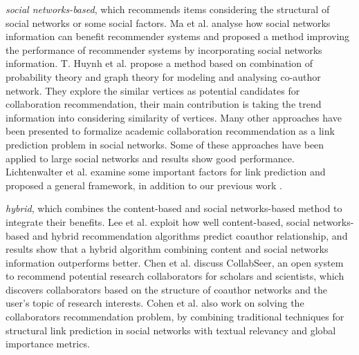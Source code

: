 \documentclass[review]{elsarticle}
\begin{document}
\emph{social networks-based}, which recommends items considering the structural of social networks or some social factors. Ma et al. \cite{ma2011recommender} analyse how social networks information can benefit recommender systems and proposed a method improving the performance of recommender systems by incorporating social networks information. T. Huynh et al. \cite{huynh2013trend} propose a method based on combination of probability theory and graph theory for modeling and analysing co-author network. They explore the similar vertices as potential candidates for collaboration recommendation, their main contribution is taking the trend information into considering similarity of vertices. Many other approaches have been presented to formalize academic collaboration recommendation as a link prediction problem \cite{chen2012discovering} \cite{sun2011co} in social networks. Some of these approaches have been applied to large social networks and results show good performance. Lichtenwalter et al. \cite{lichtenwalter2010new} examine some important factors for link prediction and proposed a general framework, in addition to our previous work \cite{li2014acrec}.

\emph{hybrid}, which combines the content-based and social networks-based method to integrate their benefits. Lee et al. \cite{lee2011recommending} exploit how well content-based, social networks-based and hybrid recommendation algorithms predict coauthor relationship, and results show that a hybrid algorithm combining content and social networks information outperforms better. Chen et al. \cite{chen2011collabseer} discuss CollabSeer, an open system to recommend potential research collaborators for scholars and scientists, which discovers collaborators based on the structure of coauthor networks and the user's topic of research interests. Cohen et al. \cite{cohen2013recommending} also work on solving the collaborators recommendation problem, by combining traditional techniques for structural link prediction in social networks with textual relevancy and global importance metrics.

\end{document}
